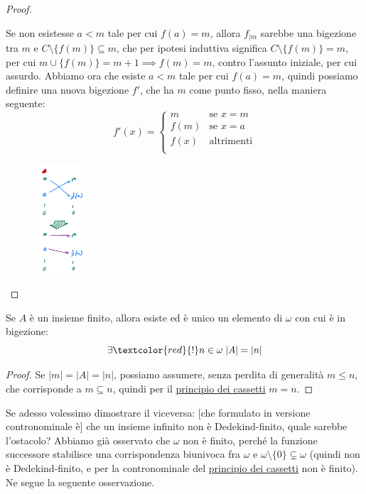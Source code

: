 \begin{proof}
\begin{itemize}
		Se non esistesse $a < m$ tale per cui $f(a) = m$, allora $f_{|m}$ sarebbe una bigezione tra $m$ e $C \setminus\{f(m)\} \subseteq m$, che per ipotesi induttiva significa $C \setminus\{f(m)\} = m$,
		per cui $m \cup \{f(m)\} = m + 1 \implies f(m) = m$, contro l'assunto iniziale, per cui assurdo. Abbiamo ora che esiste $a < m$ tale per cui $f(a) = m$, quindi possiamo definire una nuova bigezione $f'$,
		che ha $m$ come punto fisso, nella maniera seguente:
		\[ f'(x) = \begin{cases}
			m &\text{se $x = m$} \\
			f(m) &\text{se $x = a$} \\
			f(x) &\text{altrimenti} \\
		\end{cases}
			\]
			\begin{figure}[H]
				\centering
				\includegraphics[width = 1.95cm]{immagini/cassetti2.png}
			\end{figure}
	\end{itemize}
\end{proof}

\begin{corollary}
	Se $A$ è un insieme finito, allora esiste ed è unico un elemento di $\omega$ con cui è in bigezione:
	\[ \exists \textcolor{red}{!} n \in \omega \; |A| = |n|
		\]
\end{corollary}

\begin{proof}
	Se $|m| = |A| = |n|$, possiamo assumere, senza perdita di generalità $m \leq n$, che corrisponde a $m \subseteq n$, quindi per il \hyperref[cassetti]{principio dei cassetti} $m = n$.
\end{proof}

Se adesso volessimo dimostrare il viceversa: [che formulato in versione contronominale è] che un insieme infinito non è Dedekind-finito, quale sarebbe l'ostacolo? Abbiamo già osservato che $\omega$ non è finito, perché la funzione successore 
stabilisce una corrispondenza biunivoca fra $\omega$ e $\omega \setminus\{0\} \subsetneq \omega$ (quindi non è Dedekind-finito, e per la contronominale del \hyperref[cassetti]{principio dei cassetti} non è finito). Ne segue la seguente osservazione.

